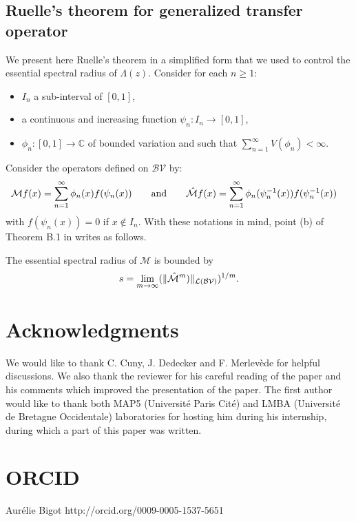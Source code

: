 \documentclass{ws-sd}
\begin{document}
\subsection{Ruelle's theorem for generalized transfer operator}
We present here Ruelle's theorem in a simplified form that we used to control the essential spectral radius of $\Lambda(z)$.
Consider for each $n \ge 1$:
\begin{itemize}
    \item $I_n$ a sub-interval of $[0,1]$,
    \item a continuous and increasing function $\psi_n : I_n \longrightarrow [0,1] $,
    \item $\phi_n : [0,1] \longrightarrow \mathbb{C}$ of bounded variation and such that $\sum_{n=1}^{\infty}V(\phi_n) < \infty$.
\end{itemize}
Consider the operators defined on $\mathcal{BV}$ by:
\begin{align*}
    &\mathcal{M}f(x) = \sum_{n=1}^{\infty}\phi_n(x)f(\psi_n(x))
    \qquad \text{and} \qquad
    \Hat{\mathcal{M}}f(x) = \sum_{n=1}^{\infty}\phi_n(\psi_n^{-1}(x))f(\psi_n^{-1}(x))
\end{align*}
with $f(\psi_n(x)) =0$ if $x \notin I_n$.
With these notations in mind, point (b) of Theorem B.1 in \cite{26} writes as follows.
\begin{theorem}[Ruelle]\label{Ruelle_theorem}
    The essential spectral radius of $\mathcal{M}$ is bounded by $$s = \underset{m \to \infty}{\lim}(\lVert \Hat{\mathcal{M}}^m)\rVert_{\mathcal{L}(\mathcal{BV})})^{1/m}.$$
\end{theorem}


    \section*{Acknowledgments}

    We would like to thank C. Cuny, J. Dedecker and F. Merlevède for helpful discussions. We also thank the reviewer for his careful reading of the paper and his comments which improved the presentation of the paper. The first author would like to thank both MAP5 (Universit\'e Paris Cit\'e) and LMBA (Universit\'e de Bretagne Occidentale) laboratories for hosting him during his internship, during which a part of this paper was written.

    \section*{ORCID}
    Aur\'elie Bigot  http://orcid.org/0009-0005-1537-5651
\end{document}
